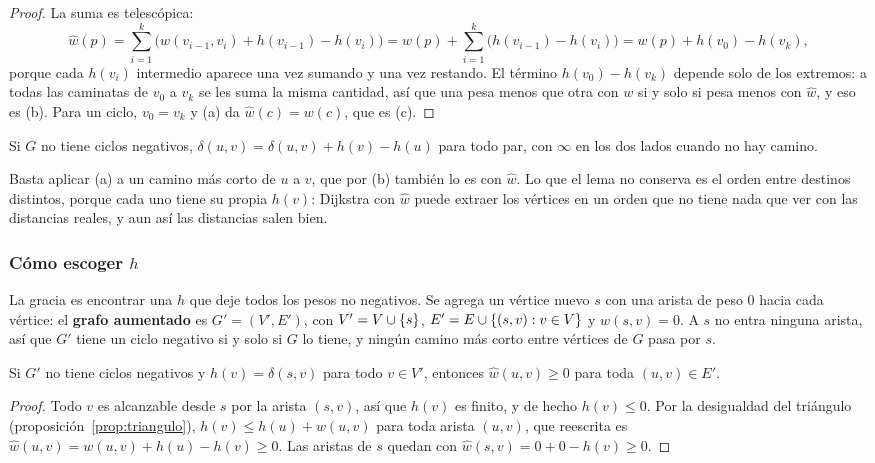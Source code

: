 \documentclass[11pt,letterpaper]{article}
\begin{document}
\begin{proof}
  La suma es telescópica:
  \[
    \hat{w}(p)
    = \sum_{i=1}^{k} \bigl( w(v_{i-1}, v_i) + h(v_{i-1}) - h(v_i)
      \bigr)
    = w(p) + \sum_{i=1}^{k} \bigl( h(v_{i-1}) - h(v_i) \bigr)
    = w(p) + h(v_0) - h(v_k) ,
  \]
  porque cada $h(v_i)$ intermedio aparece una vez sumando y una vez
  restando. El término $h(v_0) - h(v_k)$ depende solo de los extremos:
  a todas las caminatas de $v_0$ a $v_k$ se les suma la misma
  cantidad, así que una pesa menos que otra con $w$ si y solo si pesa
  menos con $\hat{w}$, y eso es (b). Para un ciclo, $v_0 = v_k$ y (a)
  da $\hat{w}(c) = w(c)$, que es (c).
\end{proof}

\begin{corolario}
  \label{cor:deshacer-johnson}
  Si $G$ no tiene ciclos negativos,
  $\delta(u, v) = \hat{\delta}(u, v) + h(v) - h(u)$ para todo par, con
  $\infty$ en los dos lados cuando no hay camino.
\end{corolario}

Basta aplicar (a) a un camino más corto de $u$ a $v$, que por (b)
también lo es con $\hat{w}$. Lo que el lema no conserva es el orden
entre destinos distintos, porque cada uno tiene su propia $h(v)$:
Dijkstra con $\hat{w}$ puede extraer los vértices en un orden que no
tiene nada que ver con las distancias reales, y aun así las distancias
salen bien.

\subsubsection*{Cómo escoger $h$}

La gracia es encontrar una $h$ que deje todos los pesos no negativos.
Se agrega un vértice nuevo $s$ con una arista de peso $0$ hacia cada
vértice: el \textbf{grafo aumentado} es $G' = (V', E')$, con
$V' = V \cup \left\{ s \right\}$, $E' = E \cup \left\{ (s, v) : v \in V \right\}$ y
$w(s, v) = 0$. A $s$ no entra ninguna arista, así que $G'$ tiene un
ciclo negativo si y solo si $G$ lo tiene, y ningún camino más corto
entre vértices de $G$ pasa por $s$.

\begin{proposicion}
  \label{prop:johnson-no-negativos}
  Si $G'$ no tiene ciclos negativos y $h(v) = \delta(s, v)$ para todo
  $v \in V'$, entonces $\hat{w}(u, v) \ge 0$ para toda
  $(u, v) \in E'$.
\end{proposicion}

\begin{proof}
  Todo $v$ es alcanzable desde $s$ por la arista $(s, v)$, así que
  $h(v)$ es finito, y de hecho $h(v) \le 0$. Por la desigualdad del
  triángulo (proposición~\ref{prop:triangulo}),
  $h(v) \le h(u) + w(u, v)$ para toda arista $(u, v)$, que reescrita
  es $\hat{w}(u, v) = w(u, v) + h(u) - h(v) \ge 0$. Las aristas de $s$
  quedan con $\hat{w}(s, v) = 0 + 0 - h(v) \ge 0$.
\end{proof}
\end{document}
